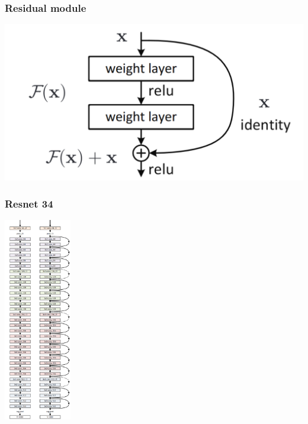 \documentclass{beamer}
\begin{document}
\begin{frame}
    \frametitle{Residual module}

    \begin{center}
        \includegraphics[width=\textwidth]{figs/residual-block.png}
    \end{center}
\end{frame}
\begin{frame}
    \frametitle{Resnet 34}

    \begin{center}
        \includegraphics[width=0.22\textwidth]{figs/resnet34.png}
    \end{center}

\end{frame}
\end{document}
